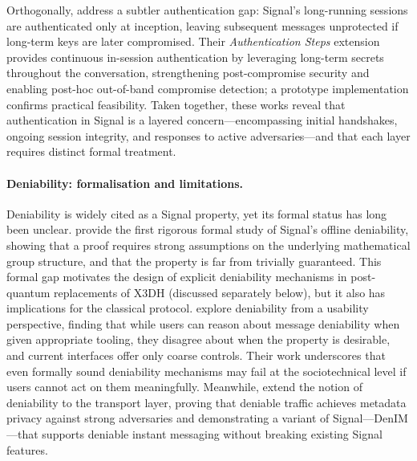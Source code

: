 Orthogonally, \textcite{dowling2022} address a subtler authentication gap: Signal's long-running sessions are authenticated only at inception, leaving subsequent messages unprotected if long-term keys are later compromised. Their \emph{Authentication Steps} extension provides continuous in-session authentication by leveraging long-term secrets throughout the conversation, strengthening post-compromise security and enabling post-hoc out-of-band compromise detection; a prototype implementation confirms practical feasibility. Taken together, these works reveal that authentication in Signal is a layered concern—encompassing initial handshakes, ongoing session integrity, and responses to active adversaries—and that each layer requires distinct formal treatment.

\paragraph{Deniability: formalisation and limitations.}
Deniability is widely cited as a Signal property, yet its formal status has long been unclear. \textcite{vatandas2020} provide the first rigorous formal study of Signal's offline deniability, showing that a proof requires strong assumptions on the underlying mathematical group structure, and that the property is far from trivially guaranteed. This formal gap motivates the design of explicit deniability mechanisms in post-quantum replacements of X3DH (discussed separately below), but it also has implications for the classical protocol. \textcite{rajendran2024} explore deniability from a usability perspective, finding that while users can reason about message deniability when given appropriate tooling, they disagree about when the property is desirable, and current interfaces offer only coarse controls. Their work underscores that even formally sound deniability mechanisms may fail at the sociotechnical level if users cannot act on them meaningfully. Meanwhile, \textcite{nelson2022,nelson2024} extend the notion of deniability to the transport layer, proving that deniable traffic achieves metadata privacy against strong adversaries and demonstrating a variant of Signal—DenIM—that supports deniable instant messaging without breaking existing Signal features.


